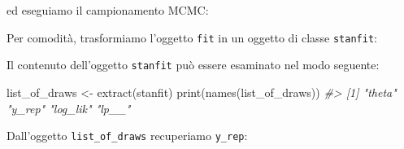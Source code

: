 \documentclass[
  10pt,
  italian,
  a4paper,
  extrafontsizes,onecolumn,openright
  ]{memoir}
\newenvironment{Shaded}{\begin{snugshade}}{\end{snugshade}}
\newcommand{\AttributeTok}[1]{\textcolor[rgb]{0.77,0.63,0.00}{#1}}
\newcommand{\CommentTok}[1]{\textcolor[rgb]{0.56,0.35,0.01}{\textit{#1}}}
\newcommand{\DecValTok}[1]{\textcolor[rgb]{0.00,0.00,0.81}{#1}}
\newcommand{\FunctionTok}[1]{\textcolor[rgb]{0.00,0.00,0.00}{#1}}
\newcommand{\NormalTok}[1]{#1}
\newcommand{\OtherTok}[1]{\textcolor[rgb]{0.56,0.35,0.01}{#1}}
\newcommand{\SpecialCharTok}[1]{\textcolor[rgb]{0.00,0.00,0.00}{#1}}
\begin{document}
\noindent
ed eseguiamo il campionamento MCMC:

\begin{Shaded}
\end{Shaded}

\noindent
Per comodità, trasformiamo l'oggetto \texttt{fit} in un oggetto di classe \texttt{stanfit}:

\begin{Shaded}
\end{Shaded}

\noindent
Il contenuto dell'oggetto \texttt{stanfit} può essere esaminato nel modo seguente:

\begin{Shaded}
\begin{Highlighting}[]
\NormalTok{list\_of\_draws }\OtherTok{\textless{}{-}} \FunctionTok{extract}\NormalTok{(stanfit)}
\FunctionTok{print}\NormalTok{(}\FunctionTok{names}\NormalTok{(list\_of\_draws))}
\CommentTok{\#\textgreater{} [1] "theta"   "y\_rep"   "log\_lik" "lp\_\_"}
\end{Highlighting}
\end{Shaded}

\noindent
Dall'oggetto \texttt{list\_of\_draws} recuperiamo \texttt{y\_rep}:
\end{document}
